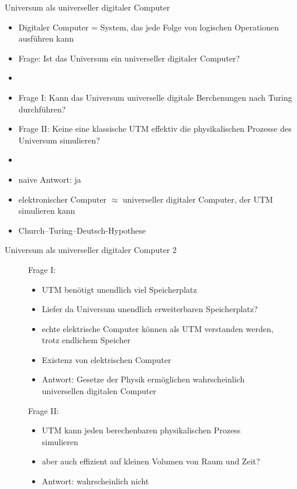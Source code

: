 \documentclass[aspectratio=1610, 9pt]{beamer}
\begin{document}
\begin{frame}{Universum als universeller digitaler Computer}
  \begin{itemize}
    \item Digitaler Computer = System, das jede Folge von logischen Operationen ausführen kann
    \item Frage: Ist das Universum ein universeller digitaler Computer?
    \item[]
    \item[\rightarrow] Frage I: Kann das Universum universelle digitale Berchenungen nach Turing durchführen?
    \item[\rightarrow] Frage II: Keine eine klassische UTM effektiv die physikalischen Prozesse des Universum simulieren?
    \item[]
    \item naive Antwort: ja
    \item elektronischer Computer $\approx$ universeller digitaler Computer, der UTM simulieren kann
    \item Church–Turing–Deutsch-Hypothese
  \end{itemize}

\end{frame}

\begin{frame}{Universum als universeller digitaler Computer 2}
  \begin{figure}
    \begin{minipage}{0.49\textwidth}
      Frage I:
      \begin{itemize}
        \item UTM benötigt unendlich viel Speicherplatz
        \item Liefer da Universum unendlich erweiterbaren Speicherplatz?
        \item echte elektrische Computer können als UTM verstanden werden, trotz endlichem Speicher
        \item Existenz von elektrischen Computer
        \item[\rightarrow] Antwort: Gesetze der Physik ermöglichen wahrscheinlich universellen digitalen Computer
      \end{itemize}
    \end{minipage}
    \hfill
    \begin{minipage}{0.49\textwidth}
      Frage II:
      \begin{itemize}
        \item UTM kann jeden berechenbaren physikalischen Prozess simulieren
        \item aber auch effizient auf kleinen Volumen von Raum und Zeit?
        \item[\rightarrow] Antwort: wahrscheinlich nicht
      \end{itemize}
    \end{minipage}
  \end{figure}
\end{frame}
\end{document}
